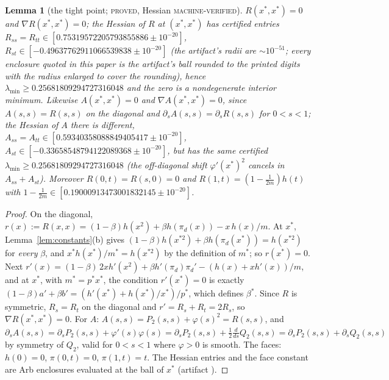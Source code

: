 \documentclass[11pt]{article}
\theoremstyle{plain}
\newtheorem{lemma}[theorem]{Lemma}
\theoremstyle{definition}
\theoremstyle{remark}
\newcommand{\lbl}[1]{\textsc{#1}}
\begin{document}
\begin{lemma}[the tight point; \lbl{proved}, Hessian \lbl{machine-verified}]\label{lem:tight}
$R(x^\ast,x^\ast)=0$ and $\nabla R(x^\ast,x^\ast)=0$; the Hessian of $R$ at
$(x^\ast,x^\ast)$ has certified entries
$R_{ss}=R_{tt}\in[0.75319572205793855886\pm10^{-20}]$,
$R_{st}\in[-0.49637762911066539838\pm10^{-20}]$ (the artifact's radii are
$\sim10^{-51}$; every enclosure quoted in this paper is the artifact's ball
rounded to the printed digits with the radius enlarged to cover the
rounding), hence
$\lambda_{\min}\ge0.25681809294727316048$ and the zero is a nondegenerate
interior minimum.  Likewise $A(x^\ast,x^\ast)=0$ and $\nabla A(x^\ast,x^\ast)=0$,
since $A(s,s)=R(s,s)$ on the diagonal and $\partial_sA(s,s)=\partial_sR(s,s)$
for $0<s<1$; the Hessian of $A$ there is different,
$A_{ss}=A_{tt}\in[0.59340358088849405417\pm10^{-20}]$,
$A_{st}\in[-0.33658548794122089368\pm10^{-20}]$, but has the same
certified $\lambda_{\min}\ge0.25681809294727316048$ (the off-diagonal shift
$\varphi'(x^\ast)^2$ cancels in $A_{ss}+A_{st}$).
Moreover $R(0,t)=R(s,0)=0$ and $R(1,t)=(1-\tfrac1{2m})h(t)$ with
$1-\tfrac1{2m}\in[0.19000913473001832145\pm10^{-20}]$.
\end{lemma}
\begin{proof}
On the diagonal, $r(x):=R(x,x)=(1-\beta)h(x^2)+\beta h(\pi_d(x))-x\,h(x)/m$.
At $x^\ast$, Lemma~\ref{lem:constants}(b) gives
$(1-\beta)h(x^{\ast2})+\beta h(\pi_d(x^\ast))=h(x^{\ast2})$ for \emph{every}
$\beta$, and $x^\ast h(x^\ast)/m^\ast=h(x^{\ast2})$ by the definition of
$m^\ast$; so $r(x^\ast)=0$.  Next
$r'(x)=(1-\beta)\,2xh'(x^2)+\beta h'(\pi_d)\pi_d'-(h(x)+xh'(x))/m$, and at
$x^\ast$, with $m^\ast=p^\ast x^\ast$, the condition $r'(x^\ast)=0$ is exactly
$(1-\beta)a'+\beta b'=(h'(x^\ast)+h(x^\ast)/x^\ast)/p^\ast$, which defines
$\beta^\ast$.  Since $R$ is symmetric, $R_s=R_t$ on the diagonal and
$r'=R_s+R_t=2R_s$, so $\nabla R(x^\ast,x^\ast)=0$.  For $A$:
$A(s,s)=P_2(s,s)+\varphi(s)^2=R(s,s)$, and
$\partial_sA(s,s)=\partial_sP_2(s,s)+\varphi'(s)\varphi(s)
=\partial_sP_2(s,s)+\tfrac12\tfrac{d}{ds}Q_2(s,s)=\partial_sP_2(s,s)+\partial_sQ_2(s,s)$
by symmetry of $Q_2$, valid for $0<s<1$ where $\varphi>0$ is smooth.  The
faces: $h(0)=0$, $\pi(0,t)=0$, $\pi(1,t)=t$.
The Hessian entries and the face constant are Arb enclosures evaluated at
the ball of $x^\ast$ (artifact ).
\end{proof}
\end{document}
